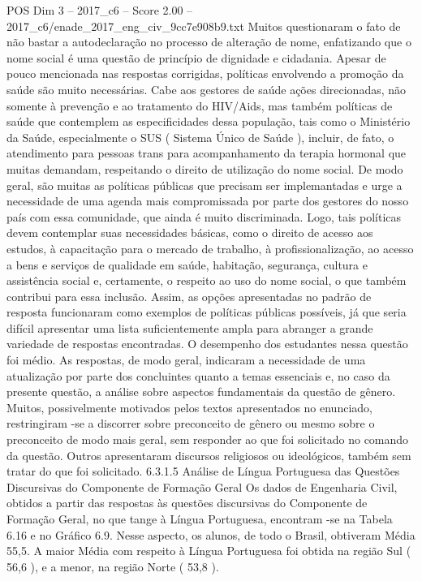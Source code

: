 \begin{textsample}{POS Dim 3 – 2017\_c6 – Score 2.00 – 2017\_c6/enade\_2017\_eng\_civ\_9cc7e908b9.txt}
Muitos questionaram o fato de não bastar a autodeclaração no processo de alteração de nome, enfatizando que o nome social é uma questão de princípio de dignidade e cidadania.
Apesar de pouco mencionada nas respostas corrigidas, políticas envolvendo a promoção da saúde são muito necessárias.
Cabe aos gestores de saúde ações direcionadas, não somente à prevenção e ao tratamento do HIV/Aids, mas também políticas de saúde que contemplem as especificidades dessa população, tais como o Ministério da Saúde, especialmente o SUS ( Sistema Único de Saúde ), incluir, de fato, o atendimento para pessoas trans para acompanhamento da terapia hormonal que muitas demandam, respeitando o direito de utilização do nome social.
De modo geral, são muitas as políticas públicas que precisam ser implemantadas e urge a necessidade de uma agenda mais compromissada por parte dos gestores do nosso país com essa comunidade, que ainda é muito discriminada.
Logo, tais políticas devem contemplar suas necessidades básicas, como o direito de acesso aos estudos, à capacitação para o mercado de trabalho, à profissionalização, ao acesso a bens e serviços de qualidade em saúde, habitação, segurança, cultura e assistência social e, certamente, o respeito ao uso do nome social, o que também contribui para essa inclusão.
Assim, as opções apresentadas no padrão de resposta funcionaram como exemplos de políticas públicas possíveis, já que seria difícil apresentar uma lista suficientemente ampla para abranger a grande variedade de respostas encontradas.
O desempenho dos estudantes nessa questão foi médio.
As respostas, de modo geral, indicaram a necessidade de uma atualização por parte dos concluintes quanto a temas essenciais e, no caso da presente questão, a análise sobre aspectos fundamentais da questão de gênero.
Muitos, possivelmente motivados pelos textos apresentados no enunciado, restringiram -se a discorrer sobre preconceito de gênero ou mesmo sobre o preconceito de modo mais geral, sem responder ao que foi solicitado no comando da questão.
Outros apresentaram discursos religiosos ou ideológicos, também sem tratar do que foi solicitado. 6.3.1.5 Análise de Língua Portuguesa das Questões Discursivas do Componente de Formação Geral Os dados de Engenharia Civil, obtidos a partir das respostas às questões discursivas do Componente de Formação Geral, no que tange à Língua Portuguesa, encontram -se na Tabela 6.16 e no Gráfico 6.9.
Nesse aspecto, os alunos, de todo o Brasil, obtiveram Média 55,5.
A maior Média com respeito à Língua Portuguesa foi obtida na região Sul ( 56,6 ), e a menor, na região Norte ( 53,8 ).

\end{textsample}
